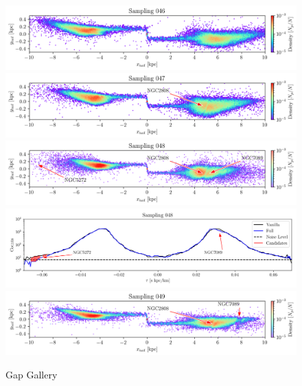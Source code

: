 \documentclass[draft]{aa}
\begin{document}
\begin{appendix}
    \begin{figure}
      \centering
      \includegraphics[width=\linewidth]{gallery_of_gaps_monte-carlo-046.png}
      \includegraphics[width=\linewidth]{gallery_of_gaps_monte-carlo-047.png}
      \includegraphics[width=\linewidth]{gallery_of_gaps_monte-carlo-048.png}
      \includegraphics[width=\linewidth]{tau-profile-monte-carlo-048.png}
      \includegraphics[width=\linewidth]{gallery_of_gaps_monte-carlo-049.png}
      \caption{Gap Gallery}
      \label{fig:gallery11}
    \end{figure} 

\end{appendix}
\end{document}

